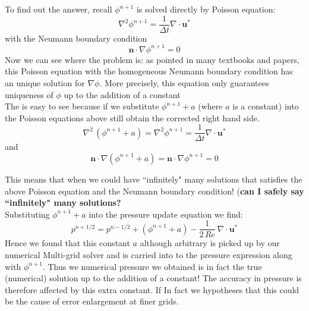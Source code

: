 To find out the answer, recall $\phi^{n+1}$ is solved directly by Poisson equation:
\begin{equation*}
\nabla^2\phi^{n+1} = \dfrac{1}{\Delta t}\nabla \cdot \textbf{u}^*
\end{equation*}
with the Neumann boundary condition
\begin{equation*}
\textbf{n} \cdot \nabla \phi^{n+1} = 0
\end{equation*}
Now we can see where the problem is: as pointed in many textbooks and papers, this Poisson equation with the homogeneous Neumann boundary condition has an unique solution for $\nabla \phi$. More precisely, this equation only guarantees uniqueness of $\phi$ up to the addition of a constant \cite{chorin1990mathematical,maria2003application,brown2001accurate}\\
The is easy to see because if we substitute $\phi^{n+1} + a$ (where $a$ is a constant) into the Poisson equations above still obtain the corrected right hand side.
\begin{equation}
\nabla^2\,(\phi^{n+1} + a) = \nabla^2\phi^{n+1} = \dfrac{1}{\Delta t}\nabla \cdot \textbf{u}^*
\end{equation}
and 
\begin{equation}
\textbf{n} \cdot \nabla (\phi^{n+1} + a) = \textbf{n} \cdot \nabla \phi^{n+1} = 0
\end{equation}

This means that when we could have ``infinitely" many solutions that satisfies the above Poisson equation and the Neumann boundary condition! (\textbf{can I safely say ``infinitely" many solutions?}\\

Substituting $\phi^{n+1} + a $ into the pressure update equation we find:
\begin{equation}
p^{n+1/2} = p^{n-1/2} + (\phi^{n+1} + a) - \dfrac{1}{2\,Re}\,\nabla \cdot \textbf{u}^*
\end{equation}
Hence we found that this constant $a$ although arbitrary is picked up by our numerical Multi-grid solver and is carried into to the pressure expression along with $\phi^{n+1}$. Thus we numerical pressure we obtained is in fact the true (numerical) solution up to the addition of a constant! The accuracy in pressure is therefore affected by this extra constant. If In fact we hypotheses that this could be the cause of error enlargement at finer grids.\\

